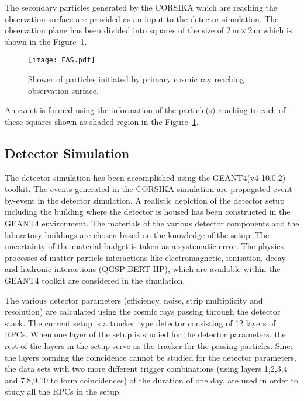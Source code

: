 The secondary particles generated by the CORSIKA which are reaching
the observation surface are provided as an input to the detector
simulation. The observation plane has been divided
into squares of the size of 2\,m\,$\times$\,2\,m which is shown in the
Figure~\ref{fig:eas}.
\begin{figure}[h]
  \centering
  \texttt{[image: EAS.pdf]} 
  \caption{Shower of particles initiated by primary cosmic ray
    reaching observation surface.}
  \label{fig:eas}
\end{figure}
An event is formed using the information of the particle(s) reaching
to each of these squares shown as shaded region in the
Figure~\ref{fig:eas}.


\subsection{Detector Simulation}
The detector simulation has been accomplished using the
GEANT4(v4-10.0.2) toolkit. The events generated in the CORSIKA
simulation are propagated event-by-event in the detector simulation.
A realistic depiction of the detector setup including the building
where the detector is housed has been constructed in the GEANT4
environment. The materials of the various detector components and
the laboratory buildings are chosen based on the knowledge of the
setup. The uncertainty of the material budget is taken as a systematic
error. The physics processes of matter-particle interactions 
like electromagnetic, ionisation, decay and hadronic interactions
(QGSP$\_$BERT$\_$HP), which are available within the GEANT4
toolkit\cite{geant4} are considered in the simulation.

The various detector parameters (efficiency, noise, strip
multiplicity and resolution) are calculated using the cosmic rays
passing through the detector stack.
The current setup is a tracker type detector consisting of 12 layers
of RPCs. When one layer of the setup is studied for the detector
parameters, the rest of the layers in the setup serve as the tracker
for the passing particles. Since the layers forming the coincidence
cannot be studied for the detector parameters, the data sets with two
more different trigger combinations (using layers 1,2,3,4 and 7,8,9,10
to form coincidences) of the duration of one day, are used in order
to study all the RPCs in the setup.

